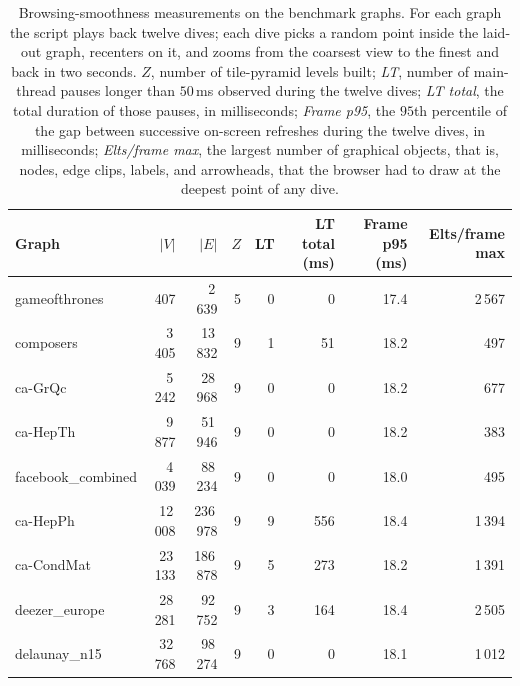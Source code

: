 \documentclass[a4paper,USenglish,anonymous]{gd-lipics-v3}
\begin{document}
\begin{table}[t]
  \centering
  \scriptsize
  \setlength{\tabcolsep}{4pt}
  \begin{tabular}{@{}lrrrrrrr@{}}
    \toprule
    Graph & $|V|$ & $|E|$ & $Z$ & LT & LT total (ms) & Frame p95 (ms) & Elts/frame max \\
    \midrule
    gameofthrones      &     407 &   2\,639 & 5 &  0 &     0 &  17.4 &   2\,567 \\
    composers          &  3\,405 &  13\,832 & 9 &  1 &    51 &  18.2 &      497 \\
    ca-GrQc            &  5\,242 &  28\,968 & 9 &  0 &     0 &  18.2 &      677 \\
    ca-HepTh           &  9\,877 &  51\,946 & 9 &  0 &     0 &  18.2 &      383 \\
    facebook\_combined &  4\,039 &  88\,234 & 9 &  0 &     0 &  18.0 &      495 \\
    ca-HepPh           & 12\,008 & 236\,978 & 9 &  9 &   556 &  18.4 &   1\,394 \\
    ca-CondMat         & 23\,133 & 186\,878 & 9 &  5 &   273 &  18.2 &   1\,391 \\
    deezer\_europe     & 28\,281 &  92\,752 & 9 &  3 &   164 &  18.4 &   2\,505 \\
    delaunay\_n15      & 32\,768 &  98\,274 & 9 &  0 &     0 &  18.1 &   1\,012 \\
    \bottomrule
  \end{tabular}
  \caption{Browsing-smoothness measurements on the benchmark graphs.
    For each graph the script plays back twelve dives; each dive picks
    a random point inside the laid-out graph, recenters on it, and
    zooms from the coarsest view to the finest and back in two
    seconds. \emph{$Z$}, number of tile-pyramid levels built;
    \emph{LT}, number of main-thread pauses longer than $50$\,ms
    observed during the twelve dives; \emph{LT total}, the total
    duration of those pauses, in milliseconds; \emph{Frame p95}, the
    $95$th percentile of the gap between successive on-screen
    refreshes during the twelve dives, in milliseconds;
    \emph{Elts/frame max}, the largest number of graphical objects,
    that is, nodes, edge clips, labels, and arrowheads, that the
    browser had to draw at the deepest point of any dive.}
  \label{tab:smoothness}
\end{table}
\end{document}
